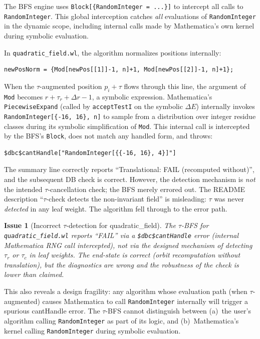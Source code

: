 \documentclass[12pt,a4paper]{article}
\theoremstyle{critical}
\newtheorem{issue}{Issue}
\theoremstyle{remark}
\begin{document}
The BFS engine uses \texttt{Block[\{RandomInteger = ...\}]} to intercept all calls to
\texttt{RandomInteger}. This global interception catches \emph{all} evaluations of
\texttt{RandomInteger} in the dynamic scope, including internal calls made by Mathematica's
own kernel during symbolic evaluation.

In \texttt{quadratic\_field.wl}, the algorithm normalizes positions internally:
\begin{lstlisting}
newPosNorm = {Mod[newPos[[1]]-1, n]+1, Mod[newPos[[2]]-1, n]+1};
\end{lstlisting}
When the $\tau$-augmented position $p_i + \tau$ flows through this line, the argument of
\texttt{Mod} becomes $r + \tau_r + \Delta r - 1$, a symbolic expression. Mathematica's
\texttt{PiecewiseExpand} (called by \texttt{acceptTestI} on the symbolic $\Delta E$)
internally invokes \texttt{RandomInteger[\{-16, 16\}, n]} to sample from a distribution
over integer residue classes during its symbolic simplification of \texttt{Mod}. This
internal call is intercepted by the BFS's \texttt{Block}, does not match any handled
form, and throws:
\begin{lstlisting}
$dbc$cantHandle["RandomInteger[{{-16, 16}, 4}]"]
\end{lstlisting}

The summary line correctly reports ``Translational: FAIL (recomputed without)'', and the
subsequent DB check is correct. However, the detection mechanism is \emph{not} the
intended $\tau$-cancellation check; the BFS merely errored out. The README description
``$\tau$-check detects the non-invariant field'' is misleading: $\tau$ was never
\emph{detected} in any leaf weight. The algorithm fell through to the error path.

\begin{issue}[Incorrect $\tau$-detection for quadratic\_field]
The $\tau$-BFS for \texttt{quadratic\_field.wl} reports ``FAIL'' via a
\texttt{\$dbc\$cantHandle} error (internal Mathematica RNG call intercepted), not via the
designed mechanism of detecting $\tau_r$ or $\tau_c$ in leaf weights. The end-state is
correct (orbit recomputation without translation), but the diagnostics are wrong and the
robustness of the check is lower than claimed.
\end{issue}

This also reveals a design fragility: any algorithm whose evaluation path (when
$\tau$-augmented) causes Mathematica to call \texttt{RandomInteger} internally will
trigger a spurious cantHandle error. The $\tau$-BFS cannot distinguish between
(a)~the user's algorithm calling \texttt{RandomInteger} as part of its logic, and
(b)~Mathematica's kernel calling \texttt{RandomInteger} during symbolic evaluation.
\end{document}
